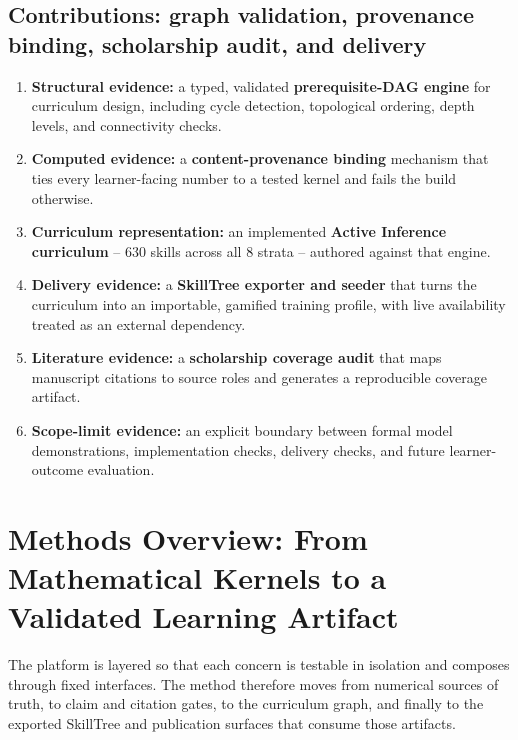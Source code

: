 \documentclass[
  english,
]{article}
\providecommand{\tightlist}{%
  \setlength{\itemsep}{0pt}\setlength{\parskip}{0pt}}
\begin{document}
\subsection{Contributions: graph validation, provenance binding,
scholarship audit, and
delivery}\label{contributions-graph-validation-provenance-binding-scholarship-audit-and-delivery}

\begin{enumerate}
\def\labelenumi{\arabic{enumi}.}
\tightlist
\item
  \textbf{Structural evidence:} a typed, validated
  \textbf{prerequisite-DAG engine} for curriculum design, including
  cycle detection, topological ordering, depth levels, and connectivity
  checks.
\item
  \textbf{Computed evidence:} a \textbf{content-provenance binding}
  mechanism that ties every learner-facing number to a tested kernel and
  fails the build otherwise.
\item
  \textbf{Curriculum representation:} an implemented \textbf{Active
  Inference curriculum} -- 630 skills across all 8 strata -- authored
  against that engine.
\item
  \textbf{Delivery evidence:} a \textbf{SkillTree exporter and seeder}
  that turns the curriculum into an importable, gamified training
  profile, with live availability treated as an external dependency.
\item
  \textbf{Literature evidence:} a \textbf{scholarship coverage audit}
  that maps manuscript citations to source roles and generates a
  reproducible coverage artifact.
\item
  \textbf{Scope-limit evidence:} an explicit boundary between formal
  model demonstrations, implementation checks, delivery checks, and
  future learner-outcome evaluation.
\end{enumerate}

\newpage

\section{Methods Overview: From Mathematical Kernels to a Validated
Learning
Artifact}\label{methods-overview-from-mathematical-kernels-to-a-validated-learning-artifact}

The platform is layered so that each concern is testable in isolation
and composes through fixed interfaces. The method therefore moves from
numerical sources of truth, to claim and citation gates, to the
curriculum graph, and finally to the exported SkillTree and publication
surfaces that consume those artifacts.
\end{document}
